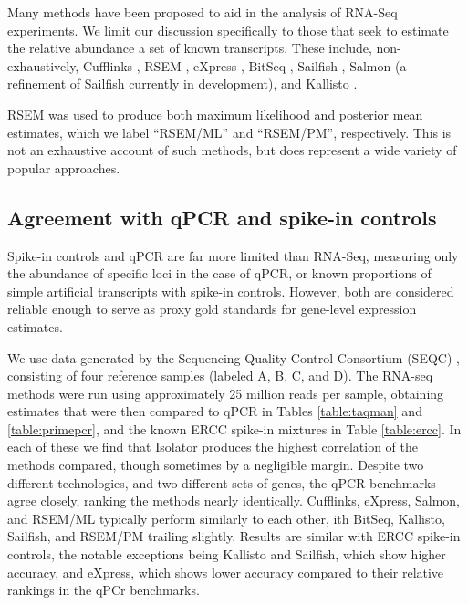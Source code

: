 \documentclass[twocolumn]{article}
\begin{document}
Many methods have been proposed to aid in the analysis of RNA-Seq
experiments. We limit our discussion specifically to those that seek to
estimate the relative abundance a set of known transcripts. These
include, non-exhaustively, Cufflinks \cite{Trapnell:2010kd},
RSEM \cite{Li:2011cb},
eXpress \cite{Roberts:2012dh},
BitSeq \cite{Glaus:2012ek},
Sailfish \cite{Patro:2014jd},
Salmon (a refinement of Sailfish currently in development), and
Kallisto \cite{Bray:2015uj}.

RSEM was used to produce both maximum likelihood and posterior
mean estimates, which we label ``RSEM/ML'' and ``RSEM/PM'', respectively.
This is not an exhaustive account of such methods, but does represent a
wide variety of popular approaches.

\subsection{Agreement with qPCR and spike-in controls}

Spike-in controls and qPCR are far more limited than RNA-Seq, measuring
only the abundance of specific loci in the case of qPCR, or known
proportions of simple artificial transcripts with spike-in controls.
However, both are considered reliable enough to serve as proxy gold
standards for gene-level expression estimates.

We use data generated by the Sequencing Quality Control Consortium (SEQC)
\cite{Consortium:2014kc}, consisting of four reference samples (labeled A, B, C,
and D). The RNA-seq methods were run using approximately 25 million reads per
sample, obtaining estimates that were then compared to qPCR in Tables
\ref{table:taqman} and \ref{table:primepcr}, and the known ERCC spike-in
mixtures in Table \ref{table:ercc}. In each of these we find that Isolator
produces the highest correlation of the methods compared, though sometimes by a
negligible margin. Despite two different technologies, and two different sets of
genes, the qPCR benchmarks agree closely, ranking the methods nearly
identically. Cufflinks, eXpress, Salmon, and RSEM/ML typically perform similarly
to each other, ith BitSeq, Kallisto, Sailfish, and RSEM/PM trailing slightly.
Results are similar with ERCC spike-in controls, the notable exceptions being
Kallisto and Sailfish, which show higher accuracy, and eXpress, which shows
lower accuracy compared to their relative rankings in the qPCr benchmarks.
\end{document}
